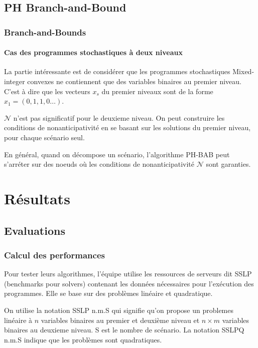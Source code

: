 \documentclass[10pt]{beamer}
\begin{document}
    \subsection{PH Branch-and-Bound}
    \begin{frame}
        \frametitle{Branch-and-Bounds}
        \framesubtitle{Cas des programmes stochastiques à deux niveaux}
    \end{frame}
    
    \begin{frame}
        La partie intéressante est de considérer que les programmes stochastiques Mixed-integer convexes ne contiennent que des variables binaires au premier niveau. C'est à dire que les vecteurs $x_s$ du premier niveaux sont de la forme $x_1 = (0, 1, 1, 0 \ldots)$.
    \end{frame}
    
    \begin{frame}
        $\mathcal{N}$ n'est pas significatif pour le deuxieme niveau. On peut construire les conditions de nonanticipativité en se basant sur les solutions du premier niveau, pour chaque scénario seul.
        
    \end{frame}
    
    \begin{frame}
        En général, quand on décompose un scénario, l'algorithme PH-BAB peut s'arréter sur des noeuds où les conditions de nonanticipativité $\mathcal{N}$ sont garanties. 
    \end{frame}
        
    \section{Résultats}
    \subsection{Evaluations}
    \begin{frame}
        \frametitle{Calcul des performances}
        Pour tester leurs algorithmes, l'équipe utilise les ressources de serveurs dit SSLP (benchmarks pour solvers) contenant les données nécessaires pour l'exécution des programmes. Elle se base sur des problèmes linéaire et quadratique.
        
        On utilise la notation SSLP n.m.S qui signifie qu'on propose un problemes linéaire à $n$ variables binaires au premier et deuxième niveau et $n \times m$ variables binaires au deuxieme niveau. S est le nombre de scénario.
        La notation SSLPQ n.m.S indique que les problèmes sont quadratiques.
    \end{frame}
    
\end{document}
